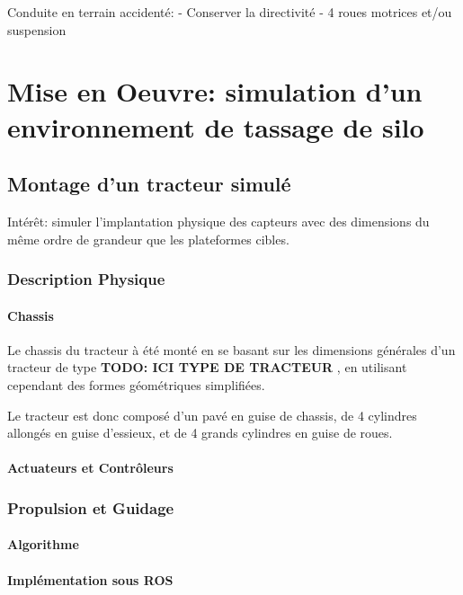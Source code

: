 \documentclass[12pt,a4paper]{report}
\begin{document}
		Conduite en terrain accidenté:
			- Conserver la directivité
			- 4 roues motrices et/ou suspension
		
	\section{Mise en Oeuvre: simulation d'un environnement de tassage de silo}
		\subsection{Montage d'un tracteur simulé}
		Intérêt: simuler l'implantation physique des capteurs avec des dimensions du même ordre de grandeur que les plateformes cibles.
		
		\subsubsection{Description Physique}
			\paragraph{Chassis}
			Le chassis du tracteur à été monté en se basant sur les dimensions générales d'un tracteur de type \textbf{TODO: ICI TYPE DE TRACTEUR} , en utilisant cependant des formes géométriques simplifiées.
			\newline
			
			Le tracteur est donc composé d'un pavé en guise de chassis, de 4 cylindres allongés en guise d'essieux, et de 4 grands cylindres en guise de roues.
			
			\paragraph{Actuateurs et Contrôleurs}
		\subsubsection{Propulsion et Guidage}
			\paragraph{Algorithme}
			
			
			\paragraph{Implémentation sous ROS}
			
\end{document}
